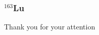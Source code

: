 \documentclass{beamer}
\begin{document}
\begin{frame}
	\frametitle{$^{163}$Lu}

	

\end{frame}




\begin{frame}[plain] %
	\begin{center}
		\bigskip\bigskip %
		{\Huge Thank you for your attention \faHeart}
	\end{center}
\end{frame}
\end{document}
